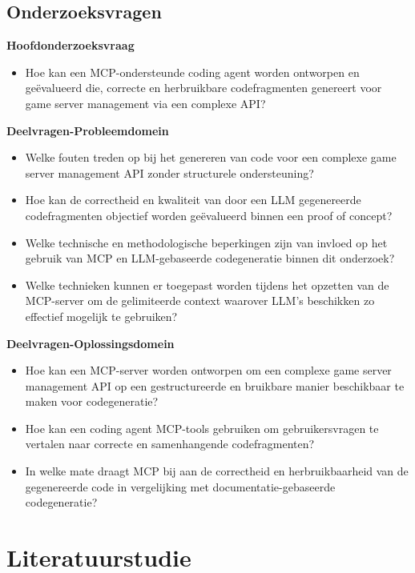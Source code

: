 
\subsection{Onderzoeksvragen}

\textbf{Hoofdonderzoeksvraag}
\begin{itemize}
  \item Hoe kan een MCP-ondersteunde coding agent worden ontworpen en geëvalueerd die, correcte en herbruikbare codefragmenten genereert voor game server management via een complexe API?
\end{itemize}

\textbf{Deelvragen-Probleemdomein}
\begin{itemize}
  \item Welke fouten treden op bij het genereren van code voor een complexe game server management API zonder structurele ondersteuning?
  \item Hoe kan de correctheid en kwaliteit van door een LLM gegenereerde codefragmenten objectief worden geëvalueerd binnen een proof of concept?
  \item Welke technische en methodologische beperkingen zijn van invloed op het gebruik van MCP en LLM-gebaseerde codegeneratie binnen dit onderzoek?
  \item Welke technieken kunnen er toegepast worden tijdens het opzetten van de MCP-server om de gelimiteerde context waarover LLM's beschikken zo effectief mogelijk te gebruiken?
\end{itemize}

\textbf{Deelvragen-Oplossingsdomein}
\begin{itemize}
  \item Hoe kan een MCP-server worden ontworpen om een complexe game server management API op een gestructureerde en bruikbare manier beschikbaar te maken voor codegeneratie?
  \item Hoe kan een coding agent MCP-tools gebruiken om gebruikersvragen te vertalen naar correcte en samenhangende codefragmenten?
  \item In welke mate draagt MCP bij aan de correctheid en herbruikbaarheid van de gegenereerde code in vergelijking met documentatie-gebaseerde codegeneratie?
\end{itemize}

\section{Literatuurstudie}
\label{sec:literatuurstudie}

